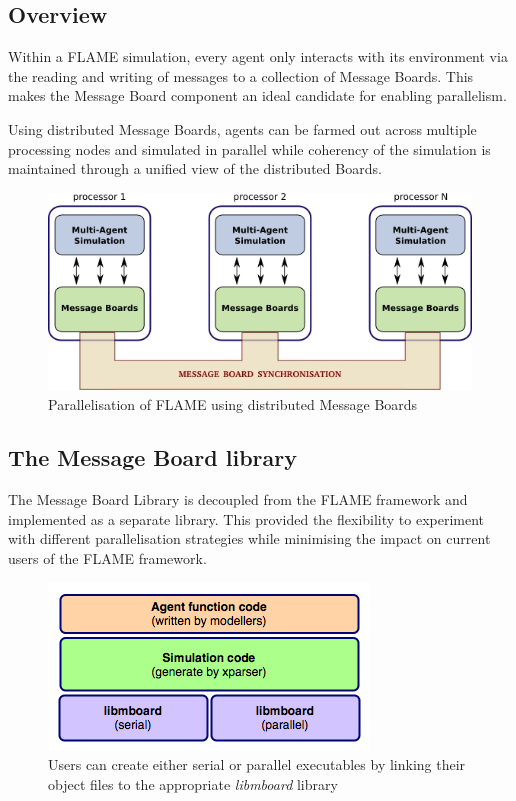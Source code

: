 \subsection{Overview}

Within a FLAME simulation, every agent only interacts with its environment via the reading and writing of messages to a collection of Message Boards. This makes the Message Board component an ideal candidate for enabling parallelism. 

Using distributed Message Boards, agents can be farmed out across multiple processing nodes and simulated in parallel while coherency of the simulation is maintained through a unified view of the distributed Boards.

\begin{figure}[ht]
 \centering
  \includegraphics[scale=0.60]{mboard_flame.jpg}
 \caption{Parallelisation of FLAME using distributed Message Boards}
 \label{fig:mb_flame}
\end{figure}

\subsection{The Message Board library}
The Message Board Library is decoupled from the FLAME framework and implemented as a separate library. This provided the flexibility to experiment with different parallelisation strategies while minimising the impact on current users of the FLAME framework.

\begin{figure}[ht]
 \centering
  \includegraphics[scale=0.60]{mboard_overview.png}
 \caption{Users can create either serial or parallel executables by linking their object files to the appropriate \textit{libmboard} library}
 \label{fig:mb_overview}
\end{figure}

